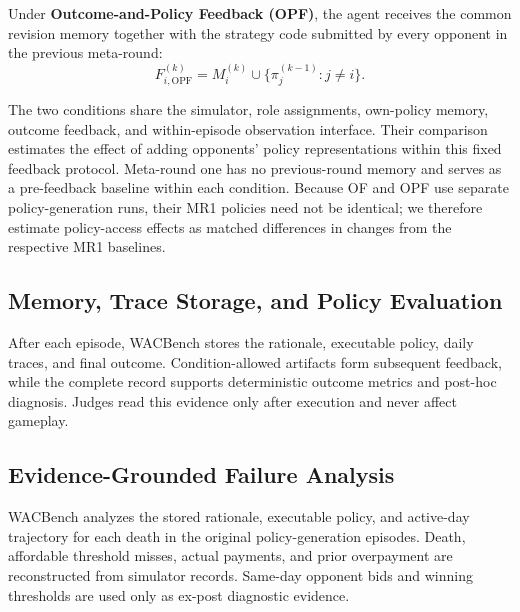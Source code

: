 \documentclass[letterpaper]{article} %
\begin{document}
Under \textbf{Outcome-and-Policy Feedback (OPF)}, the agent
receives the common revision memory together with the strategy
code submitted by every opponent in the previous meta-round:
\begin{equation}
    F_{i,\mathrm{OPF}}^{(k)}
    =
    M_i^{(k)}
    \cup
    \{\pi_j^{(k-1)}:j\neq i\}.
\end{equation}

The two conditions share the simulator, role assignments, own-policy memory,
outcome feedback, and within-episode observation interface. Their comparison
estimates the effect of adding opponents' policy representations within this
fixed feedback protocol. Meta-round one has no previous-round memory and
serves as a pre-feedback baseline within each condition. Because OF and OPF
use separate policy-generation runs, their MR1 policies need not be identical;
we therefore estimate policy-access effects as matched differences in changes
from the respective MR1 baselines.

\subsection{Memory, Trace Storage, and Policy Evaluation}

After each episode, WACBench stores the rationale, executable policy, daily
traces, and final outcome. Condition-allowed artifacts form subsequent
feedback, while the complete record supports deterministic outcome metrics
and post-hoc diagnosis. Judges read this evidence only after execution and
never affect gameplay.

\subsection{Evidence-Grounded Failure Analysis}

WACBench analyzes the stored rationale, executable policy, and active-day
trajectory for each death in the original policy-generation episodes. Death,
affordable threshold misses, actual payments, and prior overpayment are
reconstructed from simulator records. Same-day opponent bids and winning
thresholds are used only as ex-post diagnostic evidence.
\end{document}
